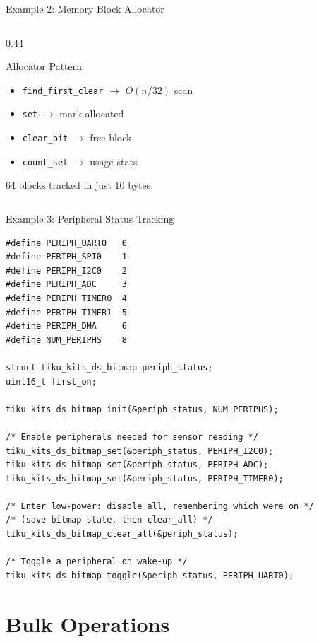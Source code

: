 \documentclass[aspectratio=169, 10pt]{beamer}
\begin{document}
\begin{frame}[fragile]{Example 2: Memory Block Allocator}
\begin{columns}[T]
\begin{column}{0.44\textwidth}
\vspace{0.5em}
\begin{block}{Allocator Pattern}
\begin{itemize}
  \item \texttt{find\_first\_clear} $\rightarrow$ $O(n/32)$ scan
  \item \texttt{set} $\rightarrow$ mark allocated
  \item \texttt{clear\_bit} $\rightarrow$ free block
  \item \texttt{count\_set} $\rightarrow$ usage stats
\end{itemize}
64 blocks tracked in just 10 bytes.
\end{block}
\end{column}
\end{columns}
\end{frame}

\begin{frame}[fragile]{Example 3: Peripheral Status Tracking}
\begin{lstlisting}[style=cstyle,
  title={Track peripheral enable/disable state}]
#define PERIPH_UART0   0
#define PERIPH_SPI0    1
#define PERIPH_I2C0    2
#define PERIPH_ADC     3
#define PERIPH_TIMER0  4
#define PERIPH_TIMER1  5
#define PERIPH_DMA     6
#define NUM_PERIPHS    8

struct tiku_kits_ds_bitmap periph_status;
uint16_t first_on;

tiku_kits_ds_bitmap_init(&periph_status, NUM_PERIPHS);

/* Enable peripherals needed for sensor reading */
tiku_kits_ds_bitmap_set(&periph_status, PERIPH_I2C0);
tiku_kits_ds_bitmap_set(&periph_status, PERIPH_ADC);
tiku_kits_ds_bitmap_set(&periph_status, PERIPH_TIMER0);

/* Enter low-power: disable all, remembering which were on */
/* (save bitmap state, then clear_all) */
tiku_kits_ds_bitmap_clear_all(&periph_status);

/* Toggle a peripheral on wake-up */
tiku_kits_ds_bitmap_toggle(&periph_status, PERIPH_UART0);
\end{lstlisting}
\end{frame}

\section{Bulk Operations}
\end{document}
